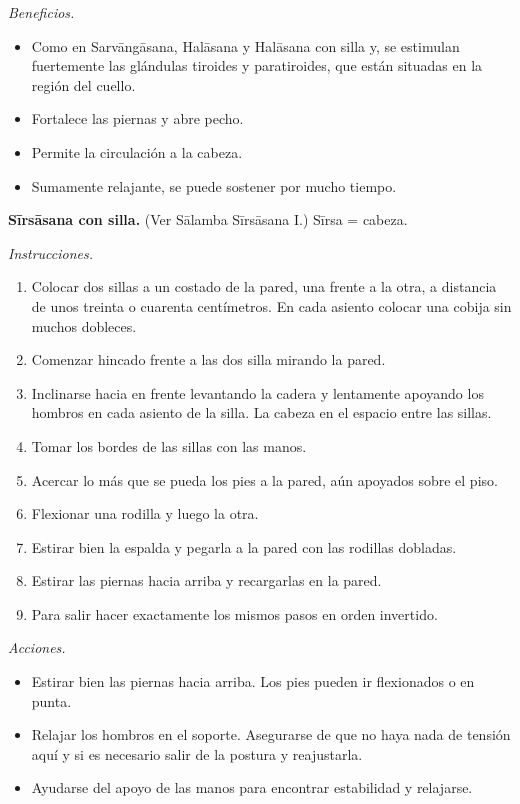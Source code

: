 \emph{Beneficios.}
\begin{itemize}
\item Como en Sarvāngāsana, Halāsana y
Halāsana con silla y, se estimulan
fuertemente las glándulas tiroides y
paratiroides, que están situadas en la región
del cuello.
\item Fortalece las piernas y abre pecho.
\item Permite la circulación a la cabeza.
\item Sumamente relajante, se puede sostener
por mucho tiempo.
\end{itemize}

\medskip\noindent\textbf{Sīrsāsana con
silla.}
(Ver Sālamba Sīrsāsana I.) Sīrsa = cabeza.

\emph{Instrucciones.}
\begin{enumerate}
\item Colocar dos sillas a un costado de la
pared, una frente a la otra, a distancia de
unos treinta o cuarenta centímetros. En cada
asiento colocar una cobija sin muchos
dobleces.
\item Comenzar hincado frente a las dos silla
mirando la pared.
\item Inclinarse hacia en frente levantando
la cadera y lentamente apoyando los hombros
en cada asiento de la silla. La cabeza en el
espacio entre las sillas.
\item Tomar los bordes de las sillas con las
manos.
\item Acercar lo más que se pueda los pies a
la pared, aún apoyados sobre el piso.
\item Flexionar una rodilla y luego la otra.
\item Estirar bien la espalda y pegarla a la
pared con las rodillas dobladas.
\item Estirar las piernas hacia arriba y
recargarlas en la pared.
\item Para salir hacer exactamente los mismos
pasos en orden invertido.
\end{enumerate}

\emph{Acciones.}
\begin{itemize}
\item Estirar bien las piernas hacia arriba.
Los pies pueden ir flexionados o en punta.
\item Relajar los hombros en el soporte.
Asegurarse de que no haya nada de tensión
aquí y si es necesario salir de la postura y
reajustarla.
\item Ayudarse del apoyo de las manos para
encontrar estabilidad y relajarse.
\end{itemize}

